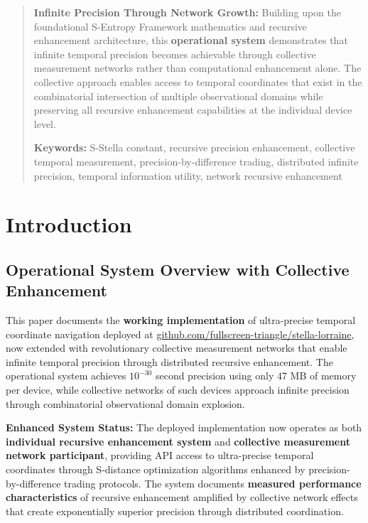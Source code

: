 \documentclass[12pt,a4paper]{article}
\begin{document}
\begin{abstract}
\textbf{Infinite Precision Through Network Growth:} Building upon the foundational S-Entropy Framework mathematics and recursive enhancement architecture, this \textbf{operational system} demonstrates that infinite temporal precision becomes achievable through collective measurement networks rather than computational enhancement alone. The collective approach enables access to temporal coordinates that exist in the combinatorial intersection of multiple observational domains while preserving all recursive enhancement capabilities at the individual device level.

\textbf{Keywords:} S-Stella constant, recursive precision enhancement, collective temporal measurement, precision-by-difference trading, distributed infinite precision, temporal information utility, network recursive enhancement
\end{abstract}

\section{Introduction}

\subsection{Operational System Overview with Collective Enhancement}

This paper documents the \textbf{working implementation} of ultra-precise temporal coordinate navigation deployed at \href{https://github.com/fullscreen-triangle/stella-lorraine}{github.com/fullscreen-triangle/stella-lorraine}, now extended with revolutionary collective measurement networks that enable infinite temporal precision through distributed recursive enhancement. The operational system achieves $10^{-30}$ second precision using only 47 MB of memory per device, while collective networks of such devices approach infinite precision through combinatorial observational domain explosion.

\textbf{Enhanced System Status:} The deployed implementation now operates as both \textbf{individual recursive enhancement system} and \textbf{collective measurement network participant}, providing API access to ultra-precise temporal coordinates through S-distance optimization algorithms enhanced by precision-by-difference trading protocols. The system documents \textbf{measured performance characteristics} of recursive enhancement amplified by collective network effects that create exponentially superior precision through distributed coordination.
\end{document}
